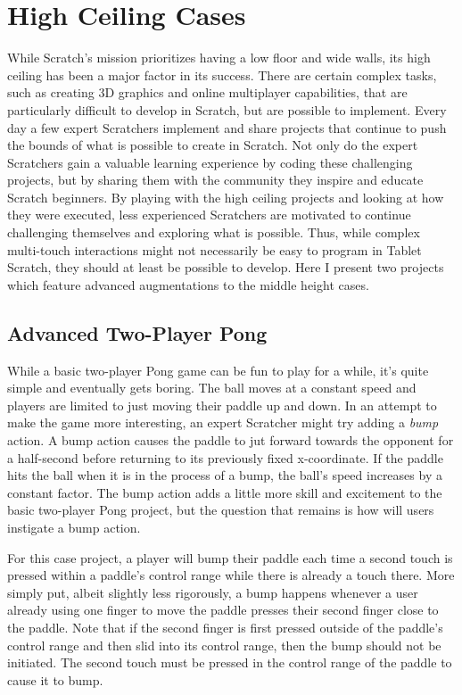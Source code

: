 \section{High Ceiling Cases}
While Scratch's mission prioritizes having a low floor and wide walls, its high ceiling has been a major factor in its success. There are certain complex tasks, such as creating 3D graphics and online multiplayer capabilities, that are particularly difficult to develop in Scratch, but are possible to implement. Every day a few expert Scratchers implement and share projects that continue to push the bounds of what is possible to create in Scratch. Not only do the expert Scratchers gain a valuable learning experience by coding these challenging projects, but by sharing them with the community they inspire and educate Scratch beginners. By playing with the high ceiling projects and looking at how they were executed, less experienced Scratchers are motivated to continue challenging themselves and exploring what is possible. Thus, while complex multi-touch interactions might not necessarily be easy to program in Tablet Scratch, they should at least be possible to develop. Here I present two projects which feature advanced augmentations to the middle height cases.

\subsection{Advanced Two-Player Pong}
While a basic two-player Pong game can be fun to play for a while, it's quite simple and eventually gets boring. The ball moves at a constant speed and players are limited to just moving their paddle up and down. In an attempt to make the game more interesting, an expert Scratcher might try adding a \emph{bump} action. A bump action causes the paddle to jut forward towards the opponent for a half-second before returning to its previously fixed x-coordinate. If the paddle hits the ball when it is in the process of a bump, the ball's speed increases by a constant factor. The bump action adds a little more skill and excitement to the basic two-player Pong project, but the question that remains is how will users instigate a bump action.

For this case project, a player will bump their paddle each time a second touch is pressed within a paddle's control range while there is already a touch there. More simply put, albeit slightly less rigorously, a bump happens whenever a user already using one finger to move the paddle presses their second finger close to the paddle. Note that if the second finger is first pressed outside of the paddle's control range and then slid into its control range, then the bump should not be initiated. The second touch must be pressed in the control range of the paddle to cause it to bump.

